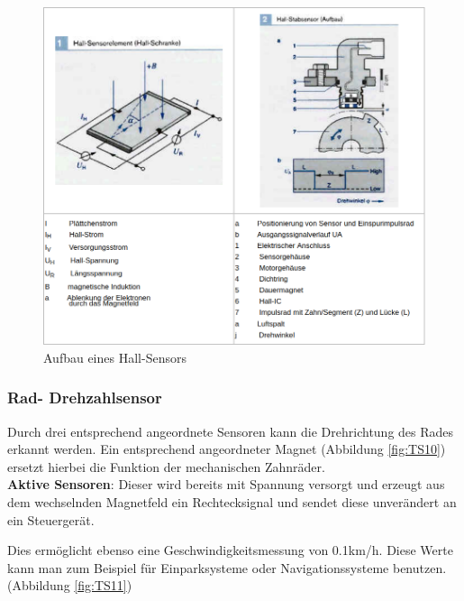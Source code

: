 				\begin{figure}[h]
					\centering
					\includegraphics[width=\textwidth]{hall.png}
					\caption[www.kfztech.de/kfztechnik/elo/sensoren/hallsensor.htm]{Aufbau eines Hall-Sensors}
                \end{figure}
                
                \subsubsection{Rad- Drehzahlsensor}

				Durch drei entsprechend angeordnete Sensoren kann die Drehrichtung des Rades erkannt werden. Ein entsprechend angeordneter Magnet (Abbildung \ref{fig:TS10}) ersetzt hierbei die Funktion der mechanischen Zahnräder.\\
                \textbf{Aktive Sensoren}: Dieser wird bereits mit Spannung versorgt und erzeugt aus dem wechselnden Magnetfeld ein Rechtecksignal und sendet diese unverändert an ein Steuergerät.
                
				Dies ermöglicht ebenso eine Geschwindigkeitsmessung von 0.1km/h. Diese Werte kann man zum Beispiel für Einparksysteme oder Navigationssysteme benutzen.\cite{TS_drehzahl_sensor}
				(Abbildung \ref{fig:TS11})

